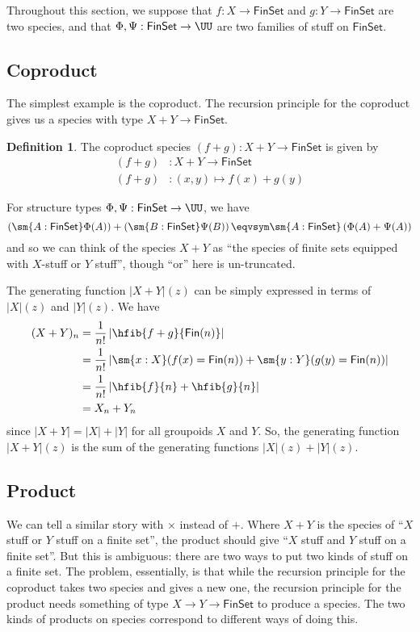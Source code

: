 \documentclass[fleqn]{article}
\newcommand{\gf}[1]{\abs{#1}\!(z)}
\newcommand{\fin}{\mathsf{Fin}}
\newcommand{\finset}{\mathsf{FinSet}}
\newcommand{\abs}[1]{\left\lvert #1 \right\rvert}
\theoremstyle{theorem}
\theoremstyle{definition}
\newtheorem{defn}{Definition}[section]
\begin{document}
Throughout this section, we suppose that $f : X \to \finset$ and $g : Y \to
\finset$ are two species, and that $\Phi, \Psi : \finset \to \UU$ are two
families of stuff on $\finset$.


\subsection{Coproduct}

The simplest example is the coproduct.  The recursion principle for the
coproduct gives us a species with type $X + Y \to \finset$.
\begin{defn}
  The coproduct species $(f + g) : X + Y \to \finset$ is given by
  \begin{align*}
    (f + g) &: X + Y \to \finset \\
    (f + g) &: (x, y) \mapsto f(x) + g(y)
  \end{align*}
\end{defn}
\noindent
For structure types $\Phi, \Psi : \finset \to \UU$, we have
\[
  \left(\sm{A : \finset}\Phi(A)\right) + \left(\sm{B : \finset}\Psi(B)\right)
  \eqvsym
  \sm{A : \finset}\left(\Phi(A) + \Psi(A)\right)
\]
and so we can think of the species $X + Y$ as ``the species of finite sets
equipped with $X$-stuff or $Y$ stuff'', though ``or'' here is un-truncated.

The generating function $\gf{X + Y}$ can be simply expressed in terms of
$\gf{X}$ and $\gf{Y}$.  We have
\begin{align*}
  (X+Y)_{n}
  &=
  \frac{1}{n!}\abs{\hfib{f+g}{\fin(n)}}
  \\&=
  \frac{1}{n!}\abs{
    \sm{x:X}(f(x) = \fin(n))
    +
    \sm{y:Y}(g(y) = \fin(n))
  }
  \\&=
  \frac{1}{n!}\abs{
    \hfib{f}{n} + \hfib{g}{n}
  }
  \\&=
  X_{n} + Y_{n}
\end{align*}
since $\abs{X + Y} = \abs{X} + \abs{Y}$ for all groupoids $X$ and $Y$.  So, the
generating function $\gf{X+Y}$ is the sum of the generating functions $\gf{X}
+ \gf{Y}$.

\subsection{Product}
We can tell a similar story with $\times$ instead of $+$.  Where $X + Y$ is
the species of ``$X$ stuff or $Y$ stuff on a finite set'', the product should
give ``$X$ stuff and $Y$ stuff on a finite set''.  But this is ambiguous: there are two ways to put
two kinds of stuff on a finite set.  The problem, essentially, is that while
the recursion principle for the coproduct takes two species and gives a new
one, the recursion principle for the product needs something of type $X \to Y
\to \finset$ to produce a species.  The two kinds of products on species
correspond to different ways of doing this.
\end{document}
